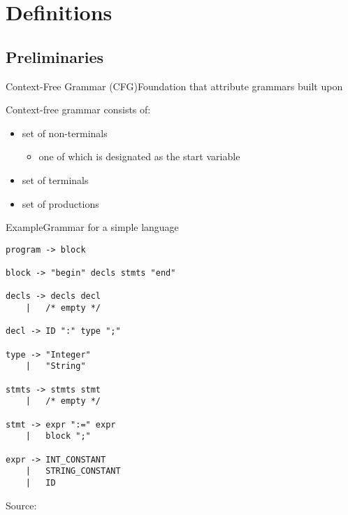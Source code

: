 
\section{Definitions}

\subsection*{Preliminaries}

\begin{frame}{Context-Free Grammar (CFG)}{Foundation that attribute grammars built upon}

Context-free grammar consists of:
\begin{itemize}
    \item set of \alert{non-terminals}
    \begin{itemize}
        \item one of which is designated as the start variable
    \end{itemize}
    \item set of \alert{terminals}
    \item set of \alert{productions}
\end{itemize}
\end{frame}


\begin{frame}[fragile=singleslide]{Example}{Grammar for a simple language}

\begin{multicols}{2}
\begin{Verbatim}[fontsize=\scriptsize]
program -> block

block -> "begin" decls stmts "end"

decls -> decls decl
    |   /* empty */

decl -> ID ":" type ";"

type -> "Integer"
    |   "String"

stmts -> stmts stmt
    |   /* empty */

stmt -> expr ":=" expr
    |   block ";"

expr -> INT_CONSTANT
    |   STRING_CONSTANT
    |   ID
\end{Verbatim}
\end{multicols}


Source: \cite{Boyland1998AnalyzingDN}

\end{frame}

